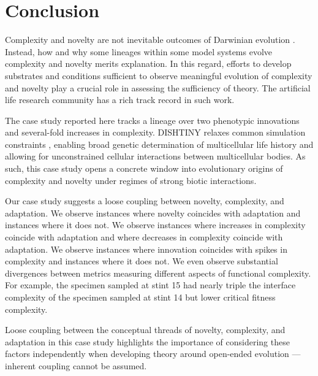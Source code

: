 \section{Conclusion}

Complexity and novelty are not inevitable outcomes of Darwinian evolution \citep{stanley2017open}.
Instead, how and why some lineages within some model systems evolve complexity and novelty merits explanation.
In this regard, efforts to develop substrates and conditions sufficient to observe meaningful evolution of complexity and novelty play a crucial role in assessing the sufficiency of theory.
The artificial life research community has a rich track record in such work.

The case study reported here tracks a lineage over two phenotypic innovations and several-fold increases in complexity.
DISHTINY relaxes common simulation constraints \citep{goldsby2012task, goldsby2014evolutionary}, enabling broad genetic determination of multicellular life history and allowing for unconstrained cellular interactions between multicellular bodies.
As such, this case study opens a concrete window into evolutionary origins of complexity and novelty under regimes of strong biotic interactions.

Our case study suggests a loose coupling between novelty, complexity, and adaptation.
We observe instances where novelty coincides with adaptation and instances where it does not.
We observe instances where increases in complexity coincide with adaptation and where decreases in complexity coincide with adaptation.
We observe instances where innovation coincides with spikes in complexity and instances where it does not.
We even observe substantial divergences between metrics measuring different aspects of functional complexity.
For example, the specimen sampled at stint 15 had nearly triple the interface complexity of the specimen sampled at stint 14 but lower critical fitness complexity.

Loose coupling between the conceptual threads of novelty, complexity, and adaptation in this case study highlights the importance of considering these factors independently when developing theory around open-ended evolution --- inherent coupling cannot be assumed.

